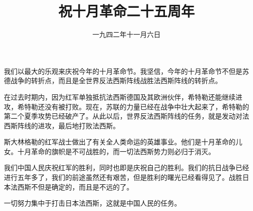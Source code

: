 
\title{祝十月革命二十五周年}
\date{一九四二年十一月六日}
\maketitle


我们以最大的乐观来庆祝今年的十月革命节。我坚信，今年的十月革命节不但是苏德战争的转折点，而且是全世界反法西斯阵线战胜法西斯阵线的转折点。

在过去时期内，因为红军单独抵抗法西斯德国及其欧洲伙伴，希特勒还能继续进攻，希特勒还没有被打败。现在，苏联的力量已经在战争中壮大起来了，希特勒的第二个夏季攻势已经破产了。从此以后，世界反法西斯阵线的任务，就是发动对法西斯阵线的进攻，最后地打败法西斯。

斯大林格勒的红军战士做出了有关全人类命运的英雄事业。他们是十月革命的儿女。十月革命的旗帜是不可战胜的，而一切法西斯势力则必归于消灭。

我们中国人民庆祝红军的胜利，同时也即是庆祝自己的胜利。我们的抗日战争已经进行五年多了，我们的前途虽然还有艰苦，但是胜利的曙光已经看得见了。战胜日本法西斯不但是确定的，而且是不远的了。

一切努力集中于打击日本法西斯，这就是中国人民的任务。
